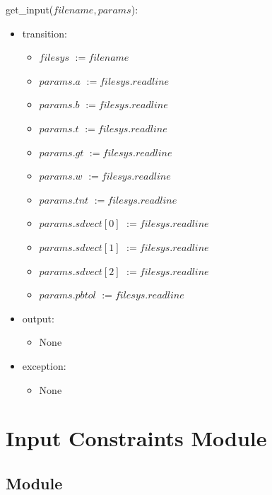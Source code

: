 \documentclass[12pt,fleqn]{article}
\begin{document}
get\_input($filename, params$):
\begin{itemize}
\item transition: \begin{itemize}
                        \item[] $filesys$ \tabto{3.5cm} $:= filename$
                        \item[] $params.a$ \tabto{3.5cm} $ := filesys.readline$
                        \item[] $params.b$ \tabto{3.5cm} $ := filesys.readline$
                        \item[] $params.t$ \tabto{3.5cm} $ := filesys.readline$
                        \item[] $params.gt$ \tabto{3.5cm} $ := filesys.readline$
                        \item[] $params.w$ \tabto{3.5cm} $ := filesys.readline$
                        \item[] $params.tnt$ \tabto{3.5cm} $ := filesys.readline$
                        \item[] $params.sdvect[0]$ \tabto{3.5cm} $ := filesys.readline$
                        \item[] $params.sdvect[1]$ \tabto{3.5cm} $ := filesys.readline$
                        \item[] $params.sdvect[2]$ \tabto{3.5cm} $ := filesys.readline$
                        \item[] $params.pbtol$ \tabto{3.5cm} $ := filesys.readline$
                        
                        \end{itemize}
\item output: \begin{itemize}
                   \item[] None
                    \end{itemize}
\item exception: \begin{itemize}
                        \item[] None
                        \end{itemize}
\end{itemize}

\newpage

\section* {Input Constraints Module}

\subsection*{Module}
\end{document}
